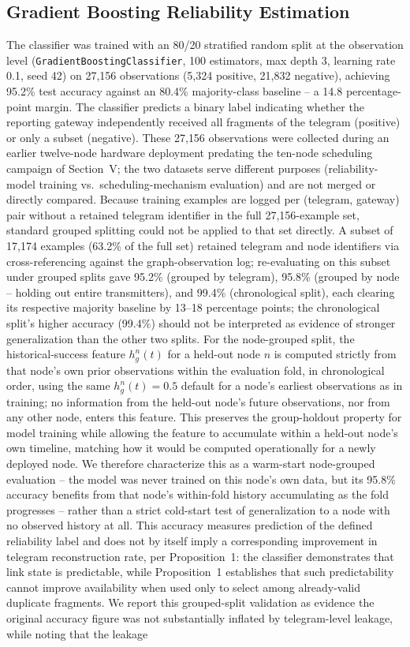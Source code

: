 \documentclass[journal]{IEEEtran}
\begin{document}
\subsection{Gradient Boosting Reliability Estimation}
The classifier was trained with an 80/20 stratified random split at the observation level (\texttt{GradientBoostingClassifier}, 100 estimators, max depth 3, learning rate 0.1, seed 42) on 27{,}156 observations (5{,}324 positive, 21{,}832 negative), achieving 95.2\% test accuracy against an 80.4\% majority-class baseline -- a 14.8 percentage-point margin. The classifier predicts a binary label indicating whether the reporting gateway independently received all fragments of the telegram (positive) or only a subset (negative). These 27{,}156 observations were collected during an earlier twelve-node hardware deployment predating the ten-node scheduling campaign of Section~V; the two datasets serve different purposes (reliability-model training vs.\ scheduling-mechanism evaluation) and are not merged or directly compared. Because training examples are logged per (telegram, gateway) pair without a retained telegram identifier in the full 27{,}156-example set, standard grouped splitting could not be applied to that set directly. A subset of 17{,}174 examples (63.2\% of the full set) retained telegram and node identifiers via cross-referencing against the graph-observation log; re-evaluating on this subset under grouped splits gave 95.2\% (grouped by telegram), 95.8\% (grouped by node -- holding out entire transmitters), and 99.4\% (chronological split), each clearing its respective majority baseline by 13--18 percentage points; the chronological split's higher accuracy (99.4\%) should not be interpreted as evidence of stronger generalization than the other two splits. For the node-grouped split, the historical-success feature $h_g^n(t)$ for a held-out node $n$ is computed strictly from that node's own prior observations within the evaluation fold, in chronological order, using the same $h_g^n(t)=0.5$ default for a node's earliest observations as in training; no information from the held-out node's future observations, nor from any other node, enters this feature. This preserves the group-holdout property for model training while allowing the feature to accumulate within a held-out node's own timeline, matching how it would be computed operationally for a newly deployed node. We therefore characterize this as a warm-start node-grouped evaluation -- the model was never trained on this node's own data, but its 95.8\% accuracy benefits from that node's within-fold history accumulating as the fold progresses -- rather than a strict cold-start test of generalization to a node with no observed history at all. This accuracy measures prediction of the defined reliability label and does not by itself imply a corresponding improvement in telegram reconstruction rate, per Proposition~1: the classifier demonstrates that link state is predictable, while Proposition~1 establishes that such predictability cannot improve availability when used only to select among already-valid duplicate fragments. We report this grouped-split validation as evidence the original accuracy figure was not substantially inflated by telegram-level leakage, while noting that the leakage 
\end{document}
